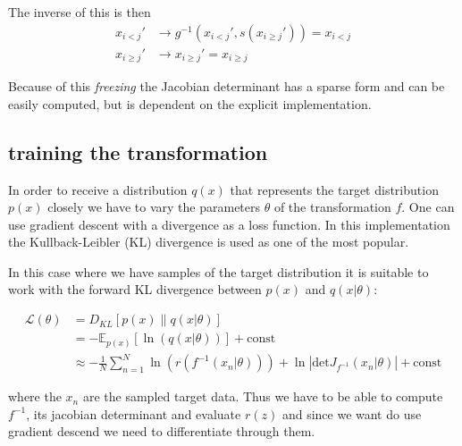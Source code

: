 \documentclass[%
 reprint,
 amsmath,amssymb,
 aps,
]{revtex4-2}
\begin{document}
The inverse of this is then
\begin{align*}
	x_{i<j}' &\rightarrow g^{-1}(x_{i<j}',s(x_{i\geq j}')) = x_{i<j}\\
	x_{i\geq j}' &\rightarrow x_{i\geq j}' = x_{i\geq j}
\end{align*}

Because of this \textit{freezing} the Jacobian determinant has a sparse form and can be easily computed, but is dependent on the explicit implementation.



\subsection{training the transformation}
In order to receive a distribution $q(x)$ that represents the target distribution $p(x)$ closely we have to vary the parameters $\theta$ of the transformation $f$. One can use gradient descent with a divergence as a loss function. In this implementation the Kullback-Leibler (KL) divergence is used as one of the most popular.

In this case where we have samples of the target distribution it is suitable to work with the forward KL divergence between $p(x)$ and $q(x|\theta)$:

\begin{align*}
	\mathcal{L}(\theta) &= D_{KL}\left[p(x)\middle\|q(x|\theta)\right]\\
	&=-\mathbb{E}_{p(x)}\left[\ln(q(x|\theta))\right] + \text{const} \\
	&\approx -\frac{1}{N}\sum_{n=1}^{N}\ln(r(f^{-1}(x_n|\theta))) + \ln\left|\text{det}J_{f^{-1}}(x_n|\theta)\right| + \text{const}
\end{align*} 

where the $x_n$ are the sampled target data. Thus we have to be able to compute $f^{-1}$, its jacobian determinant and evaluate $r(z)$ and since we want do use gradient descend we need to differentiate through them. 
\end{document}
